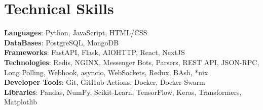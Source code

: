 \documentclass[letterpaper,11pt]{article}
\begin{document}
\section{Technical Skills}
 \begin{itemize}[leftmargin=0.15in, label={}]
    \small{\item{
     \textbf{Languages}{: Python, JavaScript, HTML/CSS} \\
     \textbf{DataBases}{: PostgreSQL, MongoDB} \\
     \textbf{Frameworks}{: FastAPI, Flask, AIOHTTP, React, NextJS} \\
     \textbf{Technologies}{: Redis, NGINX, Messenger Bots, Parsers, REST API, JSON-RPC, Long Polling, Webhook, asyncio, WebSockets, Redux, BAsh, *nix} \\
     \textbf{Developer Tools}{: Git, GitHub Actions, Docker, Docker Swarm} \\
     \textbf{Libraries}{: Pandas, NumPy, Scikit-Learn, TensorFlow, Keras, Transformers, Matplotlib}
    }}
 \end{itemize}


\end{document}
